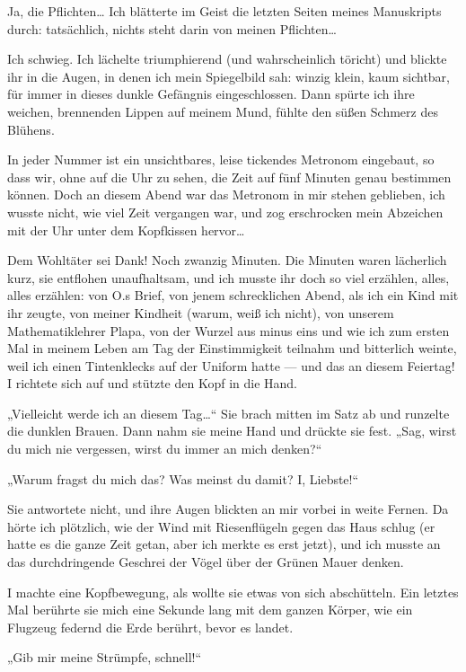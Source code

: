 Ja, die Pflichten\ldots{} Ich blätterte im Geist die letzten Seiten
meines Manuskripts durch: tatsächlich, nichts steht darin von
meinen Pflichten\ldots{}

Ich schwieg. Ich lächelte triumphierend (und wahrscheinlich
töricht) und blickte ihr in die Augen, in denen ich mein
Spiegelbild sah: winzig klein, kaum sichtbar, für immer in dieses
dunkle Gefängnis eingeschlossen. Dann spürte ich ihre weichen,
brennenden Lippen auf meinem Mund, fühlte den süßen Schmerz des
Blühens.

In jeder Nummer ist ein unsichtbares, leise tickendes
Metronom eingebaut, so dass wir, ohne auf die Uhr zu sehen, die
Zeit auf fünf Minuten genau bestimmen können. Doch an diesem Abend
war das Metronom in mir stehen geblieben, ich wusste nicht, wie
viel Zeit vergangen war, und zog erschrocken mein Abzeichen mit der
Uhr unter dem Kopfkissen hervor\ldots{}

Dem Wohltäter sei Dank! Noch zwanzig Minuten. Die Minuten waren
lächerlich kurz, sie entflohen unaufhaltsam, und ich musste ihr
doch so viel erzählen, alles, alles erzählen: von O.s Brief, von
jenem schrecklichen Abend, als ich ein Kind mit ihr zeugte, von
meiner Kindheit (warum, weiß ich nicht), von unserem
Mathematiklehrer Plapa, von der Wurzel aus minus eins und wie ich
zum ersten Mal in meinem Leben am Tag der Einstimmigkeit teilnahm
und bitterlich weinte, weil ich einen Tintenklecks auf der Uniform
hatte — und das an diesem Feiertag! I richtete sich auf und stützte
den Kopf in die Hand.

„Vielleicht werde ich an diesem Tag\ldots{}“
Sie
brach mitten im Satz ab und runzelte die dunklen Brauen. Dann nahm
sie meine Hand und drückte sie fest. „Sag, wirst du mich nie
vergessen, wirst du immer an mich denken?“

„Warum fragst du mich
das? Was meinst du damit? I, Liebste!“

Sie antwortete nicht, und ihre Augen blickten an mir vorbei in
weite Fernen. Da hörte ich plötzlich, wie der Wind mit
Riesenflügeln gegen das Haus schlug (er hatte es die ganze Zeit
getan, aber ich merkte es erst jetzt), und ich musste an das
durchdringende Geschrei der Vögel über der Grünen Mauer denken.

I machte eine Kopfbewegung, als wollte sie etwas von sich
abschütteln. Ein letztes Mal berührte sie mich eine Sekunde lang
mit dem ganzen Körper, wie ein Flugzeug federnd die Erde berührt,
bevor es landet.

„Gib mir meine Strümpfe, schnell!“

